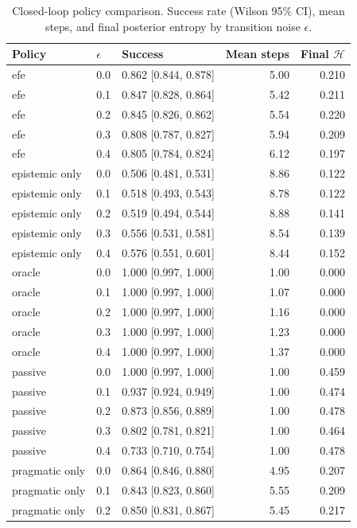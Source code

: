 \begin{table}[t]\centering\footnotesize
\caption{Closed-loop policy comparison. Success rate (Wilson 95\% CI), mean steps, and final posterior entropy by transition noise $\epsilon$.}
\label{tab:closed_loop_policy}
\begin{tabular}{llp{2.6cm}rr}
\toprule
Policy & $\epsilon$ & Success & Mean steps & Final $\mathcal{H}$ \\
\midrule
efe & 0.0 & 0.862 [0.844, 0.878] & 5.00 & 0.210 \\
efe & 0.1 & 0.847 [0.828, 0.864] & 5.42 & 0.211 \\
efe & 0.2 & 0.845 [0.826, 0.862] & 5.54 & 0.220 \\
efe & 0.3 & 0.808 [0.787, 0.827] & 5.94 & 0.209 \\
efe & 0.4 & 0.805 [0.784, 0.824] & 6.12 & 0.197 \\
epistemic only & 0.0 & 0.506 [0.481, 0.531] & 8.86 & 0.122 \\
epistemic only & 0.1 & 0.518 [0.493, 0.543] & 8.78 & 0.122 \\
epistemic only & 0.2 & 0.519 [0.494, 0.544] & 8.88 & 0.141 \\
epistemic only & 0.3 & 0.556 [0.531, 0.581] & 8.54 & 0.139 \\
epistemic only & 0.4 & 0.576 [0.551, 0.601] & 8.44 & 0.152 \\
oracle & 0.0 & 1.000 [0.997, 1.000] & 1.00 & 0.000 \\
oracle & 0.1 & 1.000 [0.997, 1.000] & 1.07 & 0.000 \\
oracle & 0.2 & 1.000 [0.997, 1.000] & 1.16 & 0.000 \\
oracle & 0.3 & 1.000 [0.997, 1.000] & 1.23 & 0.000 \\
oracle & 0.4 & 1.000 [0.997, 1.000] & 1.37 & 0.000 \\
passive & 0.0 & 1.000 [0.997, 1.000] & 1.00 & 0.459 \\
passive & 0.1 & 0.937 [0.924, 0.949] & 1.00 & 0.474 \\
passive & 0.2 & 0.873 [0.856, 0.889] & 1.00 & 0.478 \\
passive & 0.3 & 0.802 [0.781, 0.821] & 1.00 & 0.464 \\
passive & 0.4 & 0.733 [0.710, 0.754] & 1.00 & 0.478 \\
pragmatic only & 0.0 & 0.864 [0.846, 0.880] & 4.95 & 0.207 \\
pragmatic only & 0.1 & 0.843 [0.823, 0.860] & 5.55 & 0.209 \\
pragmatic only & 0.2 & 0.850 [0.831, 0.867] & 5.45 & 0.217 \\

\end{tabular}
\end{table}
